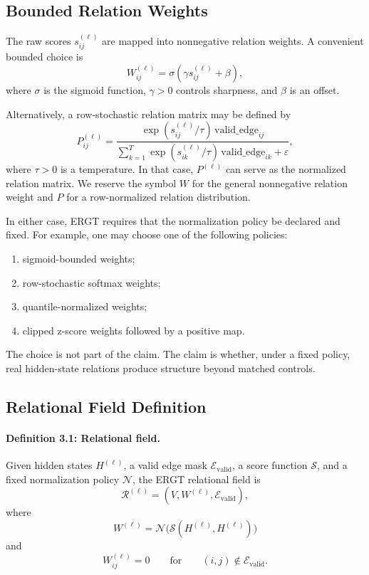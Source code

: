 \documentclass[11pt]{article}
\begin{document}
\subsection{Bounded Relation Weights}

The raw scores $s_{ij}^{(\ell)}$ are mapped into nonnegative relation weights. A convenient bounded choice is
\[
W_{ij}^{(\ell)}
=
\sigma(\gamma s_{ij}^{(\ell)}+\beta),
\]
where $\sigma$ is the sigmoid function, $\gamma>0$ controls sharpness, and $\beta$ is an offset.

Alternatively, a row-stochastic relation matrix may be defined by
\[
P_{ij}^{(\ell)}
=
\frac{
\exp(s_{ij}^{(\ell)}/\tau)\,\mathrm{valid\_edge}_{ij}
}{
\sum_{k=1}^{T}\exp(s_{ik}^{(\ell)}/\tau)\,\mathrm{valid\_edge}_{ik}+\varepsilon
},
\]
where $\tau>0$ is a temperature. In that case, $P^{(\ell)}$ can serve as the normalized relation matrix. We reserve the symbol $W$ for the general nonnegative relation weight and $P$ for a row-normalized relation distribution.

In either case, ERGT requires that the normalization policy be declared and fixed. For example, one may choose one of the following policies:
\begin{enumerate}[label=(\roman*)]
    \item sigmoid-bounded weights;
    \item row-stochastic softmax weights;
    \item quantile-normalized weights;
    \item clipped z-score weights followed by a positive map.
\end{enumerate}
The choice is not part of the claim. The claim is whether, under a fixed policy, real hidden-state relations produce structure beyond matched controls.

\subsection{Relational Field Definition}

\paragraph{Definition 3.1: Relational field.}
Given hidden states $H^{(\ell)}$, a valid edge mask $\mathcal{E}_{\mathrm{valid}}$, a score function $\mathcal{S}$, and a fixed normalization policy $\mathcal{N}$, the ERGT relational field is
\[
\mathcal{R}^{(\ell)}
=
(V,W^{(\ell)},\mathcal{E}_{\mathrm{valid}}),
\]
where
\[
W^{(\ell)}
=
\mathcal{N}\big(\mathcal{S}(H^{(\ell)},H^{(\ell)})\big)
\]
and
\[
W_{ij}^{(\ell)}=0
\qquad
\text{for}
\qquad
(i,j)\notin\mathcal{E}_{\mathrm{valid}}.
\]
\end{document}
